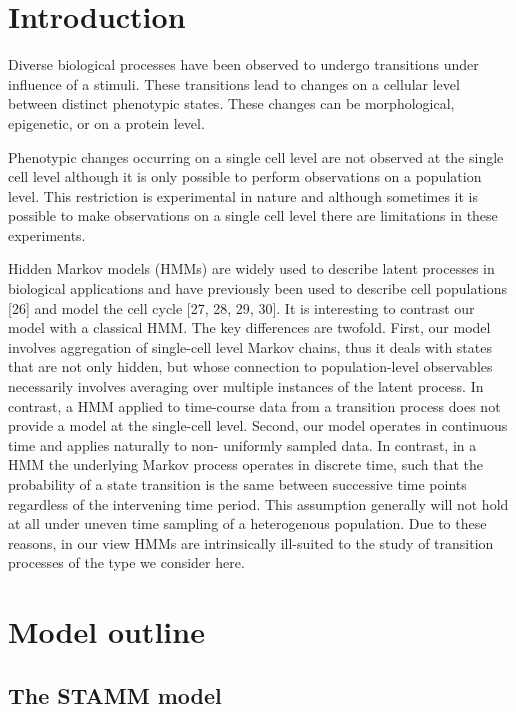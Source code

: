 \section{Introduction}
\label{sec:intro-stamm}

Diverse biological processes have been observed to undergo transitions under influence of a stimuli. These transitions lead to changes on a cellular level between distinct phenotypic states. These changes can be morphological, epigenetic, or on a protein level.

Phenotypic changes occurring on a single cell level are not observed at the single cell level although it is only possible to perform observations on a population level. This restriction is experimental in nature and although sometimes it is possible to make observations on a single cell level there are limitations in these experiments. 

{\color{red} Hidden Markov models (HMMs) are widely used to describe latent processes in biological applications and have previously been used to describe cell populations [26] and model the cell cycle [27, 28, 29, 30]. It is interesting to contrast our model with a classical HMM. The key differences are twofold. First, our model involves aggregation of single-cell level Markov chains, thus it deals with states that are not only hidden, but whose connection to population-level observables necessarily involves averaging over multiple instances of the latent process. In contrast, a HMM applied to time-course data from a transition process does not provide a model at the single-cell level. Second, our model operates in continuous time and applies naturally to non- uniformly sampled data. In contrast, in a HMM the underlying Markov process operates in discrete time, such that the probability of a state transition is the same between successive time points regardless of the intervening time period. This assumption generally will not hold at all under uneven time sampling of a heterogenous population. Due to these reasons, in our view HMMs are intrinsically ill-suited to the study of transition processes of the type we consider here.
}

\section{Model outline}
\label{sec:method}

\subsection{The STAMM model}
\label{sec:mast-model}

